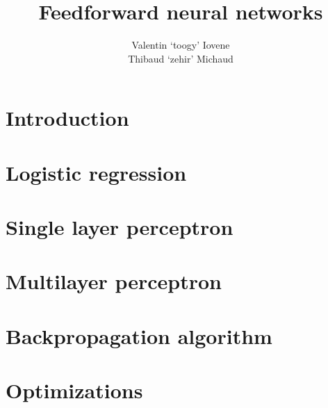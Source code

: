 \documentclass{beamer}
\title{Feedforward neural networks}
\author{Valentin `toogy' Iovene\\
Thibaud `zehir' Michaud}
\begin{document}
\maketitle

\section{Introduction}


\section{Logistic regression}


\section{Single layer perceptron}


\section{Multilayer perceptron}


\section{Backpropagation algorithm}


\section{Optimizations}

\end{document}
